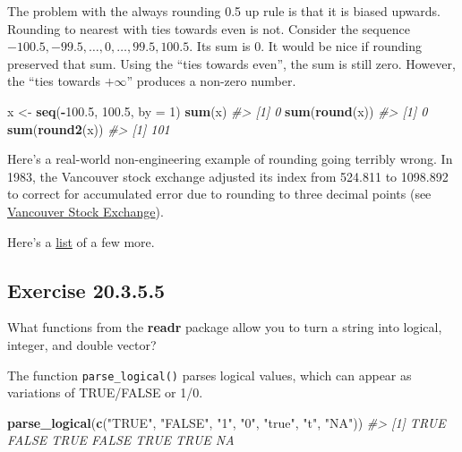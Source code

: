 \documentclass[]{book}
\newenvironment{Shaded}{\begin{snugshade}}{\end{snugshade}}
\newcommand{\CommentTok}[1]{\textcolor[rgb]{0.56,0.35,0.01}{\textit{#1}}}
\newcommand{\DataTypeTok}[1]{\textcolor[rgb]{0.13,0.29,0.53}{#1}}
\newcommand{\DecValTok}[1]{\textcolor[rgb]{0.00,0.00,0.81}{#1}}
\newcommand{\FloatTok}[1]{\textcolor[rgb]{0.00,0.00,0.81}{#1}}
\newcommand{\KeywordTok}[1]{\textcolor[rgb]{0.13,0.29,0.53}{\textbf{#1}}}
\newcommand{\NormalTok}[1]{#1}
\newcommand{\OperatorTok}[1]{\textcolor[rgb]{0.81,0.36,0.00}{\textbf{#1}}}
\newcommand{\StringTok}[1]{\textcolor[rgb]{0.31,0.60,0.02}{#1}}
\theoremstyle{plain}
\theoremstyle{remark}
\begin{document}
The problem with the always rounding 0.5 up rule is that it is biased
upwards. Rounding to nearest with ties towards even is not. Consider the
sequence \(-100.5, -99.5, \dots, 0, \dots, 99.5, 100.5\). Its sum is 0.
It would be nice if rounding preserved that sum. Using the ``ties
towards even'', the sum is still zero. However, the ``ties towards
\(+\infty\)'' produces a non-zero number.

\begin{Shaded}
\begin{Highlighting}[]
\NormalTok{x <-}\StringTok{ }\KeywordTok{seq}\NormalTok{(}\OperatorTok{-}\FloatTok{100.5}\NormalTok{, }\FloatTok{100.5}\NormalTok{, }\DataTypeTok{by =} \DecValTok{1}\NormalTok{)}
\KeywordTok{sum}\NormalTok{(x)}
\CommentTok{#> [1] 0}
\KeywordTok{sum}\NormalTok{(}\KeywordTok{round}\NormalTok{(x))}
\CommentTok{#> [1] 0}
\KeywordTok{sum}\NormalTok{(}\KeywordTok{round2}\NormalTok{(x))}
\CommentTok{#> [1] 101}
\end{Highlighting}
\end{Shaded}

Here's a real-world non-engineering example of rounding going terribly
wrong. In 1983, the Vancouver stock exchange adjusted its index from
524.811 to 1098.892 to correct for accumulated error due to rounding to
three decimal points (see
\href{https://en.wikipedia.org/wiki/Vancouver_Stock_Exchange}{Vancouver
Stock Exchange}).

Here's a
\href{https://web.ma.utexas.edu/users/arbogast/misc/disasters.html}{list}
of a few more.

\hypertarget{exercise-20.3.5.5}{%
\subsection*{\texorpdfstring{Exercise
{20.3.5.5}}{Exercise 20.3.5.5}}\label{exercise-20.3.5.5}}

What functions from the \textbf{readr} package allow you to turn a
string into logical, integer, and double vector?

The function \texttt{parse\_logical()} parses logical values, which can
appear as variations of TRUE/FALSE or 1/0.

\begin{Shaded}
\begin{Highlighting}[]
\KeywordTok{parse_logical}\NormalTok{(}\KeywordTok{c}\NormalTok{(}\StringTok{"TRUE"}\NormalTok{, }\StringTok{"FALSE"}\NormalTok{, }\StringTok{"1"}\NormalTok{, }\StringTok{"0"}\NormalTok{, }\StringTok{"true"}\NormalTok{, }\StringTok{"t"}\NormalTok{, }\StringTok{"NA"}\NormalTok{))}
\CommentTok{#> [1]  TRUE FALSE  TRUE FALSE  TRUE  TRUE    NA}
\end{Highlighting}
\end{Shaded}
\end{document}
